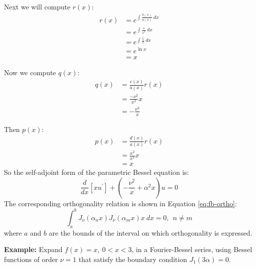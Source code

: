 \vspace{0.25cm}

\noindent Next we will compute $r(x)$:
\begin{align*}
r(x) &= e^{\int \frac{b(x)}{a(x)} \ dx} \\
&= e^{\int \frac{x}{x^2} \ dx} \\
&= e^{\int \frac{1}{x} \ dx} \\
&= e^{\ln{x}} \\
&= x
\end{align*}

\vspace{0.25cm}

\noindent Now we compute $q(x)$:
\begin{align*}
q(x) &= \frac{c(x)}{a(x)}r(x) \\
&= \frac{-\nu^2}{x^2}x \\
&= -\frac{\nu^2}{x}
\end{align*}

\vspace{0.25cm}

\noindent Then $p(x)$:
\begin{align*}
p(x) &= \frac{d(x)}{a(x)}r(x) \\
&=\frac{x^2}{x^2}x \\
&= x
\end{align*}
So the self-adjoint form of the parametric Bessel equation is:
\begin{equation*}
\frac{d}{dx}\left[x u^{\prime} \right] + \left(-\frac{\nu^2}{x} + \alpha^2 x \right)u = 0
\end{equation*}
The corresponding orthogonality relation is shown in Equation \ref{eq:fb-ortho}:
\begin{equation}
\int_{a}^{b}J_{\nu}(\alpha_n x) J_{\nu}(\alpha_m x) x \ dx = 0, \ \ n \ne m
\label{eq:fb-ortho}
\end{equation}
where $a$ and $b$ are the bounds of the interval on which orthogonality is expressed.

\vspace{0.5cm}

\noindent\textbf{Example:} Expand $f(x)=x, \ 0<x<3$, in a Fourier-Bessel series, using Bessel functions of order $\nu=1$ that satisfy the boundary condition $J_{1}(3\alpha)=0.$

